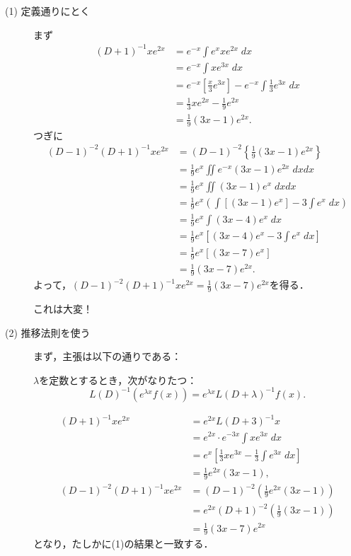 \begin{description}
    \item[(1) 定義通りにとく] まず
    \begin{align*}
        (D+1)^{-1}xe^{2x} &= e^{-x} \int e^x xe^{2x} \; dx \\
        &= e^{-x} \int x e^{3x} \; dx \\
        &= e^{-x} \left[\frac{x}{3}e^{3x}\right] - e^{-x} \int \frac{1}{3}e^{3x} \; dx \\
        &= \frac{1}{3}xe^{2x} - \frac{1}{9}e^{2x} \\
        &= \frac{1}{9}(3x-1)e^{2x}.
    \end{align*}
    つぎに
    \begin{align*}
        (D-1)^{-2}(D+1)^{-1}xe^{2x} &= (D-1)^{-2} \left\{\frac{1}{9}(3x-1)e^{2x}\right\} \\
        &= \frac{1}{9}e^x \iint e^{-x} (3x-1) e^{2x} \; dxdx \\
        &= \frac{1}{9}e^x \iint (3x-1)e^x \; dxdx \\
        &= \frac{1}{9}e^x \left(\int [(3x-1)e^x] - 3\int e^x \; dx \right) \\
        &= \frac{1}{9}e^x \int (3x-4)e^x \; dx \\
        &= \frac{1}{9}e^x \left[(3x-4)e^x - 3 \int e^x \; dx\right] \\
        &= \frac{1}{9}e^x \left[(3x-7)e^x\right] \\
        &= \frac{1}{9}(3x-7)e^{2x}.
    \end{align*}
    よって，$(D-1)^{-2}(D+1)^{-1}xe^{2x} = \frac{1}{9}(3x-7)e^{2x}$を得る．

    これは大変！
    
    \item[(2) 推移法則を使う] まず，主張は以下の通りである：
    \begin{theorem}[推移法則]
        $\lambda$を定数とするとき，次がなりたつ：
        \[ L(D)^{-1}(e^{\lambda x}f(x)) = e^{\lambda x} L(D+\lambda)^{-1} f(x).\]
    \end{theorem}
    \begin{align*}
        (D+1)^{-1}xe^{2x} &= e^{2x} L(D+3)^{-1} x \\
        &= e^{2x} \cdot e^{-3x} \int x e^{3x} \; dx \\
        &= e^x \left[\frac{1}{3}xe^{3x} - \frac{1}{3}\int e^{3x} \; dx\right] \\
        &= \frac{1}{9}e^{2x}(3x-1), \\
        (D-1)^{-2}(D+1)^{-1}xe^{2x} &= (D-1)^{-2} \left(\frac{1}{9}e^{2x}(3x-1)\right) \\
        &= e^{2x} (D+1)^{-2} \left(\frac{1}{9}(3x-1)\right) \\
        &= \frac{1}{9}(3x-7)e^{2x}
    \end{align*}
    となり，たしかに(1)の結果と一致する．


\end{description}
